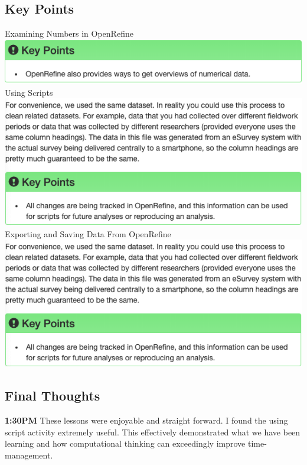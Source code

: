 \documentclass{article}
\begin{document}
\subsection{Key Points}
Examining Numbers in OpenRefine \\
\includegraphics[width=\textwidth]{Images/OpenRefine_4.png} \\
Using Scripts \\
\includegraphics[width=\textwidth]{Images/OpenRefine_5.png} \\
Exporting and Saving Data From OpenRefine \\
\includegraphics[width=\textwidth]{Images/OpenRefine_6.png}

\subsection{Final Thoughts}
\textbf{1:30PM} These lessons were enjoyable and straight forward. I found the using script activity extremely useful. This effectively demonstrated what we have been learning and how computational thinking can exceedingly improve time-management. 

\clearpage 
\end{document}
